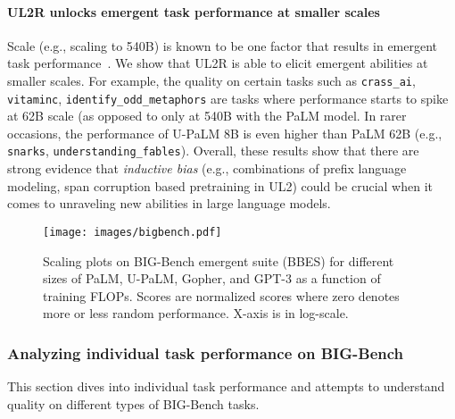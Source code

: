 \documentclass{article}
\newcommand{\methodname}{UL2R\xspace}
\newcommand{\modelname}{U-PaLM\xspace}
\begin{document}
\paragraph{\methodname unlocks emergent task performance at smaller scales} Scale (e.g., scaling to 540B) is known to be one factor that results in emergent task performance~\citep{wei2022emergent}. We show that \methodname is able to elicit emergent abilities at smaller scales. For example, the quality on certain tasks such as \texttt{crass\_ai}, \texttt{vitaminc}, \texttt{identify\_odd\_metaphors} are tasks where performance starts to spike at 62B scale (as opposed to only at 540B with the PaLM model. In rarer occasions, the performance of \modelname 8B is even higher than PaLM 62B (e.g., \texttt{snarks}, \texttt{understanding\_fables}). Overall, these results show that there are strong evidence that \textit{inductive bias} (e.g., combinations of prefix language modeling, span corruption based pretraining in UL2) could be crucial when it comes to unraveling new abilities in large language models.

\begin{figure}[t]
     \centering
     \texttt{[image: images/bigbench.pdf]}
    \caption{Scaling plots on BIG-Bench emergent suite (BBES) for different sizes of PaLM, \modelname, Gopher, and GPT-3 as a function of training FLOPs. Scores are normalized scores where zero denotes more or less random performance. X-axis is in log-scale.}
    \label{fig:downstream_scaling}
\end{figure}

\subsubsection{Analyzing individual task performance on BIG-Bench}
This section dives into individual task performance and attempts to understand quality on different types of BIG-Bench tasks.
\end{document}
